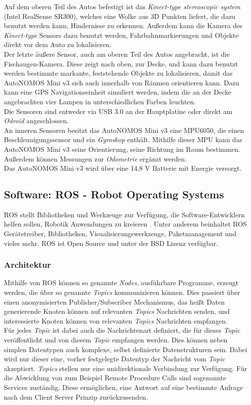 Auf dem oberen Teil des Autos befestigt ist das \textit{Kinect-type stereoscopic system} (Intel RealSense SR300), welches eine Wolke aus 3D Punkten liefert, die dazu benutzt werden kann, Hindernisse zu erkennen. Außerdem kann die Kamera des \textit{Kinect-type} Sensors dazu benutzt werden, Fahrbahnmarkierungen und Objekte direkt vor dem Auto zu lokalisieren.\\
Der letzte äußere Sensor, auch am oberen Teil des Autos angebracht, ist die Fischaugen-Kamera. Diese zeigt nach oben, zur Decke, und kann dazu benutzt werden bestimmte markante, feststehende Objekte zu lokalisieren, damit das AutoNOMOS Mini v3 sich auch innerhalb von Räumen orientieren kann. Dazu kann eine GPS Navigationseinheit simuliert werden, indem die an der Decke angebrachten vier Lampen in unterschiedlichen Farben leuchten. \\
Die Sensoren sind entweder via USB 3.0 an der Hauptplatine oder direkt am \textit{Odroid} angeschlossen. \\
An inneren Sensoren besitzt das AutoNOMOS Mini v3 eine MPU6050, die einen Beschleunigungssensor und ein \textit{Gyroskop} enthält. Mithilfe dieser MPU kann das AutoNOMOS Mini v3 seine Orientierung, seine Richtung im Raum bestimmen. Außerdem können Messungen zur \textit{Odometrie} ergänzt werden.\\
Das AutoNOMOS Mini v3 wird über eine 14,8 V Batterie mit Energie versorgt.

\subsection{Software: ROS - Robot Operating Systems}
ROS stellt Bibliotheken und Werkzeuge zur Verfügung, die Software-Entwicklern helfen sollen, Robotik Anwendungen zu kreieren \citep{ROS}. Unter anderem beinhaltet ROS Gerätetreiber, Bibliotheken, Visualisierungswerkzeuge, Paketmanagement und vieles mehr. ROS ist Open Source und unter der BSD Lizenz verfügbar.
\subsubsection{Architektur}
Mithilfe von ROS können so genannte \textit{Nodes}, ausführbare Programme, erzeugt werden, die über so genannte \textit{Topics} kommunizieren können. Dies passiert über einen anonymisierten Publisher/Subscriber Mechanismus, das heißt Daten generierende Knoten können auf relevanten \textit{Topics} Nachrichten senden, und interessierte Knoten können von relevanten \textit{Topics} Nachrichten empfangen. \\
Für jedes \textit{Topic} ist dabei auch die Nachrichtenart definiert, die für dieses \textit{Topic} veröffentlicht und von diesem \textit{Topic} empfangen werden. Dies können neben simplen Datentypen auch komplexe, selbst definierte Datenstrukturen sein. Dabei wird nur dieser eine, vorher festgelegte Datentyp der Nachricht vom \textit{Topic} akzeptiert.
\textit{Topics} stellen nur eine unidirektionale Verbindung zur Verfügung. Für die Abwicklung von zum Beispiel Remote Procedure Calls sind sogenannte Services zuständig. Diese ermöglichen, eine Antwort auf eine bestimmte Anfrage nach dem Client Server Prinzip zurückzusenden.
